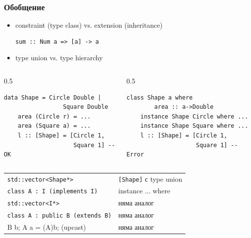 \documentclass{beamer}
\begin{document}
\begin{frame}[fragile]
\frametitle{Обобщение}

\begin{itemize}
  \item constraint (type class) vs. extension (inheritance)
\begin{lstlisting}[basicstyle=\tiny]
sum :: Num a => [a] -> a  
\end{lstlisting}
  \item type union vs. type hierarchy
\end{itemize}
\begin{columns}[t]
  \begin{column}{0.5\textwidth}
    \begin{lstlisting}[basicstyle=\tiny]
    data Shape = Circle Double | 
                 Square Double
    area (Circle r) = ...
    area (Square a) = ...
    l :: [Shape] = [Circle 1, 
                    Square 1] -- OK
    \end{lstlisting}

  \end{column}
  \begin{column}{0.5\textwidth}
    \begin{lstlisting}[basicstyle=\tiny]
    class Shape a where
        area :: a->Double
    instance Shape Circle where ...
    instance Shape Square where ...
    l :: [Shape] = [Circle 1, 
                    Square 1] -- Error
    \end{lstlisting}

  \end{column} 
\end{columns}


\begin{center}  
    \begin{tabular}{l | l}
      \verb|std::vector<Shape*>| & \verb|[Shape]| с type union
      \\ 
      \verb|class A : I (implements I)| & instance ... where  
      \\ 
      \verb|std::vector<I*>| & няма аналог
      \\ 
      \verb|class A : public B (extends B)| & няма аналог  
      \\
      B b; A a = (A)b; (upcast) & няма аналог
      
    \end{tabular}

\end{center}

\end{frame}
\end{document}
